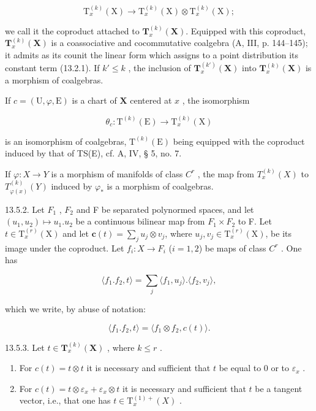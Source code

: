 \[
\mathrm{T} _ {x} ^ {(k)} (\mathrm{X}) \rightarrow \mathrm{T} _ {x} ^ {(k)} (\mathrm{X}) \otimes \mathrm{T} _ {x} ^ {(k)} (\mathrm{X});
\]

we call it the coproduct attached to \(\mathbf{T}_{x}^{(k)}(\mathbf{X})\). Equipped with this coproduct, \(\mathbf{T}_{x}^{(k)}(\mathbf{X})\) is a coassociative and cocommutative coalgebra (A, III, p. 144–145); it admits as its counit the linear form which assigns to a point distribution its constant term (13.2.1). If \(k' \leqslant k\) , the inclusion of \(\mathbf{T}_{x}^{(k')}(\mathbf{X})\) into \(\mathbf{T}_{x}^{(k)}(\mathbf{X})\) is a morphism of coalgebras.

If \(c = (\mathrm{U},\varphi ,\mathrm{E})\) is a chart of \(\mathbf{X}\) centered at \(x\) , the isomorphism

\[
\theta_ {c} \colon \mathrm{T} ^ {(k)} (\mathrm{E}) \rightarrow \mathrm{T} _ {x} ^ {(k)} (\mathrm{X})
\]

is an isomorphism of coalgebras, \(\mathrm{T}^{(k)}(\mathrm{E})\) being equipped with the coproduct induced by that of TS(E), cf. A, IV, § 5, no. 7.

If \(\varphi: X \to Y\) is a morphism of manifolds of class \(C^r\) , the map from \(T_x^{(k)}(X)\) to \(T_{\varphi(x)}^{(k)}(Y)\) induced by \(\varphi_*\) is a morphism of coalgebras.

13.5.2. Let \(F_{1}\) , \(F_{2}\) and F be separated polynormed spaces, and let \((u_{1}, u_{2}) \mapsto u_{1}.u_{2}\) be a continuous bilinear map from \(F_{1} \times F_{2}\) to F. Let \(t \in \mathrm{T}_{x}^{(r)}(\mathrm{X})\) and let \(\boldsymbol{c}(t) = \sum_{j} u_{j} \otimes v_{j}\), where \(u_{j},v_{j} \in \mathrm{T}_{x}^{(r)}(\mathrm{X})\), be its image under the coproduct. Let \(f_{i}: X \to F_{i}\) (\(i=1,2\)) be maps of class \(C^{r}\) . One has

\[
\langle f _ {1}. f _ {2}, t \rangle = \sum_ {j} \langle f _ {1}, u _ {j} \rangle . \langle f _ {2}, v _ {j} \rangle ,
\]

which we write, by abuse of notation:

\[
\langle f _ {1}. f _ {2}, t \rangle = \langle f _ {1} \otimes f _ {2}, c (t) \rangle .
\]

13.5.3. Let \(t \in \mathbf{T}_x^{(k)}(\mathbf{X})\) , where \(k \leqslant r\) .

\begin{enumerate}
\def\labelenumi{\alph{enumi})}
\item
  For \(c(t)=t\otimes t\) it is necessary and sufficient that \(t\) be equal to 0 or to \(\varepsilon_{x}\) .
\item
  For \(c(t)=t\otimes\varepsilon_{x}+\varepsilon_{x}\otimes t\) it is necessary and sufficient that \(t\) be a tangent vector, i.e., that one has \(t\in\mathrm{T}_{x}^{(1)+}(X)\) .
\end{enumerate}

